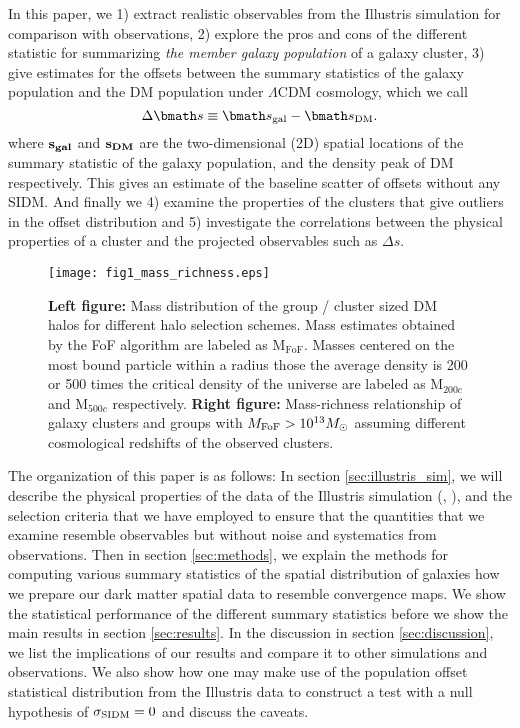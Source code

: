 In this paper, we 
1) extract realistic observables from the Illustris simulation for
comparison with observations, 2) explore the pros and cons of the different statistic for 
summarizing {\it the member galaxy population} of a galaxy cluster, 3)	
give estimates for the offsets between the summary statistics of the galaxy  
population and the DM population under $\Lambda$CDM cosmology, which we call 
\begin{equation}
	\Delta \vec{s} \equiv \vec{s}_{\rm gal} - \vec{s}_{\rm DM}.
\end{equation}
where $\bf{s}_{gal}$ and $\bf{s}_{DM}$ are the two-dimensional (2D) spatial
locations of the summary statistic of the galaxy population, and the density
peak of DM respectively. This gives
an estimate of the baseline scatter of offsets without any SIDM. And finally we 
4) examine the properties of the clusters that give outliers in 
the offset distribution and 5) investigate the  
correlations between the physical properties of a cluster and the projected 
observables such as $\Delta s$. 
\begin{figure*}
	\texttt{[image: fig1\_mass\_richness.eps]}
	\caption{ {\bf Left figure:} Mass distribution of the group / cluster sized 
		DM halos for different halo selection schemes. Mass estimates obtained by the
		FoF algorithm are labeled as  M$_{\text{FoF}}$.
		Masses centered on the most bound particle within a radius those the 
		average density is 200 or 500 times the critical density of the universe are 
		labeled as M$_{200c}$ and M$_{500c}$ respectively. 
		{\bf Right figure:} 
		Mass-richness relationship of galaxy clusters and groups with 
		$M_{\rm FoF} > 10^{13} M_{\odot}$ assuming different cosmological redshifts
		of the observed clusters. 
\label{fig:mass_richness}}
\end{figure*}

The organization of this paper is as follows:
In section \ref{sec:illustris_sim}, we will describe the physical properties of 
the data of the Illustris
simulation (\citealt{Vogelsberger2014}, \citealt{Genel2014a}), 
and the selection criteria that we have employed to ensure that the
quantities that we examine resemble observables but without noise and
systematics from observations. 
Then in section \ref{sec:methods}, 
we explain the methods for computing various 
summary statistics of the spatial distribution of galaxies how we prepare our dark
matter spatial data to resemble convergence maps. We show the statistical performance
of the different summary statistics before we show the main results
in section \ref{sec:results}. In the discussion in section \ref{sec:discussion}, 
we list the implications of our
results and compare it to other simulations and observations. We also 
show how one may make use of the population offset statistical distribution
from the Illustris data to construct a test with 
a null hypothesis of $\sigma_{\rm SIDM} = 0$ and discuss the caveats. 


